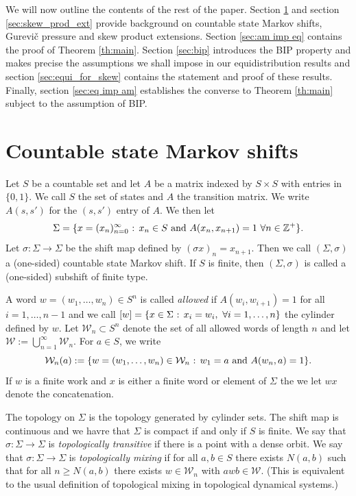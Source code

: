 \documentclass[11pt,letterpaper]{amsart}
\theoremstyle{definition}
\numberwithin{equation}{section}
\numberwithin{theorem}{section}
\def\Z{\mathbb{Z}}
\def\Z{\mathbb Z}
\begin{document}
We will now outline the contents of the rest of the paper. 
Section \ref{sec:CSMS} and 
section \ref{sec:skew_prod_ext} provide background on countable state Markov shifts, Gurevi\v{c} pressure and skew product extensions.
Section \ref{sec:am imp eq} contains the proof of Theorem \ref{th:main}.
Section \ref{sec:bip} introduces the BIP property and makes precise the assumptions we shall impose in our 
equidistribution results and section \ref{sec:equi_for_skew} contains the statement and proof of these results.
Finally, section \ref{sec:eq imp am} establishes the converse to Theorem \ref{th:main} subject to the assumption of BIP.



\section{Countable state Markov shifts}\label{sec:CSMS}
Let $S$ be a countable set and let $A$ be a matrix indexed by $S \times S$ with
entries in $\{0,1\}$. We call $S$ the set of states and $A$ the transition matrix. 
We write $A(s,s')$ for the $(s,s')$ entry of $A$.
We then let 
\[
\Sigma=\{x=(x_n)_{n=0}^\infty \hbox{ : } x_n \in S \mbox{ and } A(x_n,x_{n+1})=1 \ \forall n \in \Z^+\}.
\]
Let $\sigma : \Sigma \to \Sigma$ be the shift map defined by
$(\sigma x)_n=x_{n+1}$. Then we call $(\Sigma,\sigma)$
a (one-sided) countable state Markov shift. If $S$ is finite, then $(\Sigma,\sigma)$ is called a (one-sided) subshift of finite type.

A word $w=(w_1,\ldots,w_{n}) \in S^n$ is called \emph{allowed} if $A(w_i,w_{i+1})=1$ for all $i=1,\ldots,n-1$
and we call $[w]=\{x \in \Sigma \hbox{ : } x_i=w_i, \ \forall i=1,\ldots,n\}$ the cylinder defined by $w$.
Let 
$\mathcal W_n \subset S^n$ denote the set of all allowed words of length $n$ and let
$\mathcal W := \bigcup_{n=1}^\infty \mathcal W_n$. 
For $a \in S$, we write
\[
\mathcal W_n(a) := \{w=(w_1,\ldots,w_n)\in \mathcal W_n \hbox{ : } w_1=a \mbox{ and } 
A(w_n,a)=1\}.
\]
If $w$ is a finite work and $x$ is either a finite word or element of $\Sigma$ the we let $wx$ denote
the concatenation.


The topology on $\Sigma$ is the topology generated by cylinder sets. The shift map is continuous and
we havre that $\Sigma$ is compact if and only if $S$ is finite. 
We say that $\sigma : \Sigma \to \Sigma$ is \emph{topologically transitive} if there is a
point with a dense orbit. 
We say that
$\sigma : \Sigma \to \Sigma$ is \emph{topologically mixing}
if for all $a,b \in S$ there exists $N(a,b)$
such that for all $n \ge N(a,b)$ there exists $w \in \mathcal W_n$ with $awb \in \mathcal W$.
(This is equivalent to the usual definition of topological mixing in topological dynamical systems.)
\end{document}
